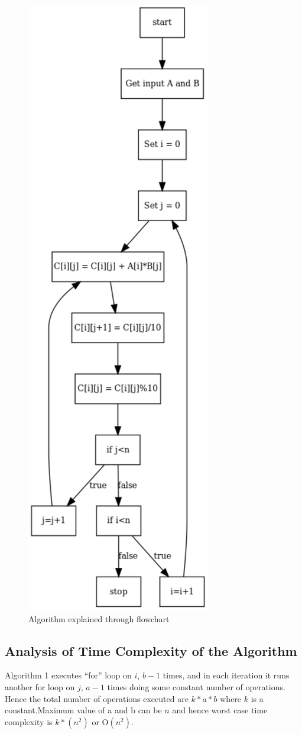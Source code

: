\documentclass[11pt]{article}
\begin{document}
\begin{figure}[!h]
\centerline{\includegraphics[scale=0.6]{flowc}}
\caption{Algorithm explained through flowchart}
\end{figure}


\subsection{Analysis of Time Complexity of the Algorithm}
Algorithm 1 executes ``for'' loop on $i$, $b-1$ times, and in each iteration it runs another for loop on $j$, $a-1$ times doing some constant number of operations. \\
Hence the total number of operations executed are $k*a*b$ where $k$ is a constant.Maximum value of a and b can be $n$ and hence worst case time complexity is $k*(n^2)$ or O$(n^2)$.
\end{document}
